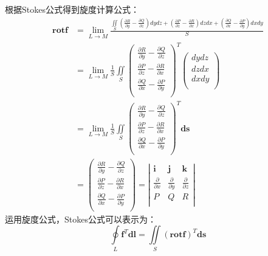 根据Stokes公式得到旋度计算公式：
\begin{align*}
\mathbf{rot}\boldsymbol{f}&=\underset{L\rightarrow M}{\lim}\frac{\iint\limits_S{\left( \frac{\partial R}{\partial y}-\frac{\partial Q}{\partial z} \right) dydz+\left( \frac{\partial P}{\partial z}-\frac{\partial R}{\partial x} \right) dzdx+\left( \frac{\partial Q}{\partial x}-\frac{\partial P}{\partial y} \right) dxdy}}{S} \\
&=\underset{L\rightarrow M}{\lim}\frac{1}{S}\iint\limits_S{\left( \begin{array}{c}
	\frac{\partial R}{\partial y}-\frac{\partial Q}{\partial z}\\
	\frac{\partial P}{\partial z}-\frac{\partial R}{\partial x}\\
	\frac{\partial Q}{\partial x}-\frac{\partial P}{\partial y}\\
\end{array} \right) ^T\left( \begin{array}{c}
	dydz\\
	dzdx\\
	dxdy\\
\end{array} \right)} \\
&=\underset{L\rightarrow M}{\lim}\frac{1}{S}\iint\limits_S{\left( \begin{array}{c}
	\frac{\partial R}{\partial y}-\frac{\partial Q}{\partial z}\\
	\frac{\partial P}{\partial z}-\frac{\partial R}{\partial x}\\
	\frac{\partial Q}{\partial x}-\frac{\partial P}{\partial y}\\
\end{array} \right) ^T\boldsymbol{ds}} \\
&=\left( \begin{array}{c}
	\frac{\partial R}{\partial y}-\frac{\partial Q}{\partial z}\\
	\frac{\partial P}{\partial z}-\frac{\partial R}{\partial x}\\
	\frac{\partial Q}{\partial x}-\frac{\partial P}{\partial y}\\
\end{array} \right) =\left| \begin{matrix}
	\mathbf{i}&		\mathbf{j}&		\mathbf{k}\\
	\frac{\partial}{\partial x}&		\frac{\partial}{\partial y}&		\frac{\partial}{\partial z}\\
	P&		Q&		R\\
\end{matrix} \right|
\end{align*}
运用旋度公式，Stokes公式可以表示为：
\[
\oint\limits_L{\boldsymbol{f}^T\boldsymbol{dl}}=\iint\limits_S{\left( \mathbf{rot}\boldsymbol{f} \right) ^T\boldsymbol{ds}}
\]

